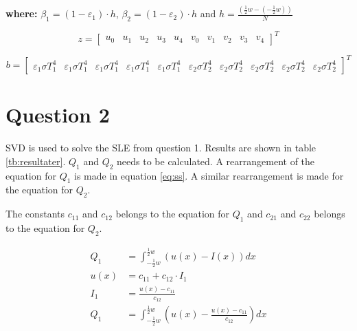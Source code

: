 \textbf{where:} \( \beta_1 = (1-\varepsilon_1) \cdot h \),   \(\beta_2 = (1-\varepsilon_2) \cdot h\) and   \( h=\frac { \left( \frac { 1 }{ 2 } w-\left( -\frac{1}{2} w \right)  \right)  }{ N }  \)

\begin{equation}
 z ={ \begin{bmatrix}
 u_0 & 
u_1 &
 u_2 &
 u_3 &
 u_4 &
 v_0 &
 v_1 &
 v_2 &
 v_3 &
 v_4 
 \end{bmatrix} }^{ T } 
 \label{eq:x}
\end{equation}

\begin{equation}
 b ={ \begin{bmatrix}
 \varepsilon_1 \sigma T_1^4 &
 \varepsilon_1 \sigma T_1^4&
 \varepsilon_1 \sigma T_1^4&
 \varepsilon_1 \sigma T_1^4&
 \varepsilon_1 \sigma T_1^4&
 \varepsilon_2 \sigma T_2^4&
 \varepsilon_2 \sigma T_2^4&
 \varepsilon_2 \sigma T_2^4&
 \varepsilon_2 \sigma T_2^4&
 \varepsilon_2 \sigma T_2^4
 \end{bmatrix} }^{ T } 
 \label{eq:b}
\end{equation}


\newpage
\section*{Question 2}
SVD is used to solve the SLE from question 1. Results are shown in table \ref{tb:resultater}.
$Q_1$ and $Q_2$ needs to be calculated. A rearrangement of the equation for $Q_1$ is made in equation \ref{eq:ss}.	A similar rearrangement is made for the equation for $Q_2$.

The constants \( c_{11} \) and \( c_{12} \) belongs to the equation for \( Q_1 \) and \( c_{21} \) and \( c_{22} \) belongs to the equation for \( Q_2 \).

\begin{equation}
\begin{align*}
Q_{ 1 }&=\int _{ -\frac { 1 }{ 2 } w }^{ \frac { 1 }{ 2 } w } \left( { u }\left( x \right) -I\left( x \right)  \right) { dx }\\ 
u\left( x \right) &={ c }_{ 11 }+{ c }_{ 12 }\cdot I_{ 1 }\\ 
{ I }_{ 1 }&=\frac { u\left( x \right) -{ c }_{ 11 } }{ { c }_{ 12 } } \\ 
Q_{ 1 }&=\int _{ -\frac { 1 }{ 2 } w }^{ \frac { 1 }{ 2 } w } \left( { u }\left( x \right) -\frac { u\left( x \right) -{ c }_{ 11 } }{ { c }_{ 12 } }  \right) { dx }
\end{align*}
\label{eq:ss}
\end{equation}

